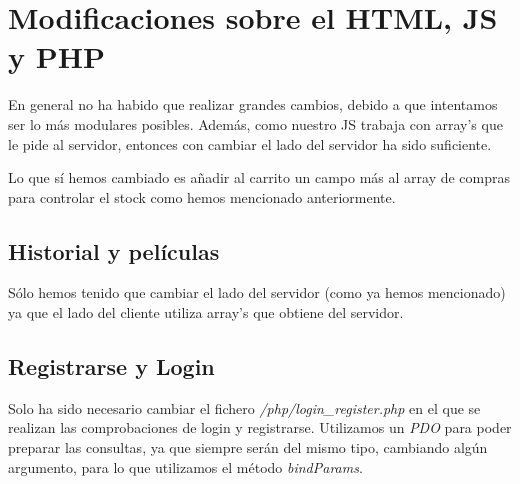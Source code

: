 \documentclass[nochap]{apuntes}
\begin{document}
\section{Modificaciones sobre el HTML, JS y PHP}
En general no ha habido que realizar grandes cambios, debido a que intentamos ser lo más modulares posibles. Además, como nuestro JS trabaja con array's que le pide al servidor, entonces con cambiar el lado del servidor ha sido suficiente.

Lo que sí hemos cambiado es añadir al carrito un campo más al array de compras para controlar el stock como hemos mencionado anteriormente.

\subsection{Historial y películas}
Sólo hemos tenido que cambiar el lado del servidor (como ya hemos mencionado) ya que el lado del cliente utiliza array's que obtiene del servidor.


\subsection{Registrarse y Login}

Solo ha sido necesario cambiar el fichero \textit{/php/login\_register.php} en el que se realizan las comprobaciones de login y registrarse. Utilizamos un \textit{PDO} para poder preparar las consultas, ya que siempre serán del mismo tipo, cambiando algún argumento, para lo que utilizamos el método \textit{bindParams}.
\end{document}
